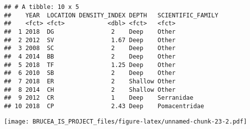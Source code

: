 \documentclass[
]{article}
\begin{document}
\begin{verbatim}
## # A tibble: 10 x 5
##    YEAR  LOCATION DENSITY_INDEX DEPTH   SCIENTIFIC_FAMILY
##    <fct> <fct>            <dbl> <fct>   <fct>            
##  1 2018  DG                2    Deep    Other            
##  2 2012  SV                1.67 Deep    Other            
##  3 2008  SC                2    Deep    Other            
##  4 2014  BB                2    Deep    Other            
##  5 2018  TF                1.25 Deep    Other            
##  6 2010  SB                2    Deep    Other            
##  7 2018  ER                2    Shallow Other            
##  8 2014  CH                2    Shallow Other            
##  9 2012  CR                1    Deep    Serranidae       
## 10 2018  CP                2.43 Deep    Pomacentridae
\end{verbatim}

\texttt{[image: BRUCEA\_IS\_PROJECT\_files/figure-latex/unnamed-chunk-23-2.pdf]}
\end{document}
